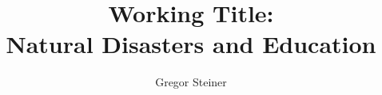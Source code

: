 \documentclass[11pt]{article}
\title{Working Title: \\ Natural Disasters and Education}
\author{Gregor Steiner}
\begin{document}
\maketitle

\begin{abstract}
\end{abstract}















\end{document}
